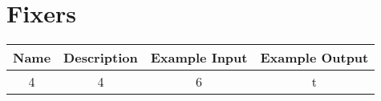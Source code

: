 \section{Fixers}
\label{appendix:Fixers}
\begin{table}
\begin{tabular}[center]{|c|c|c|c|}
    Name & Description & Example Input & Example Output \\
    \hline
    4 & 4 & 6 & t
\end{tabular}
\end{table}